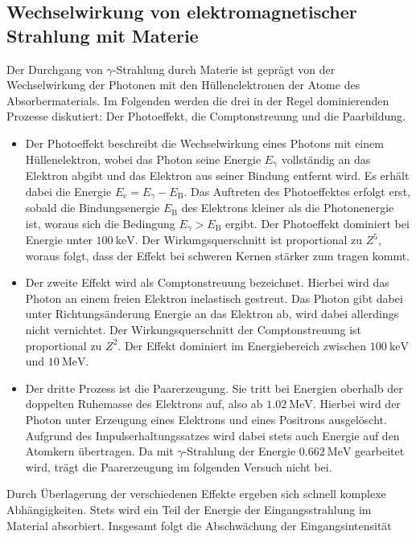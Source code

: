 \subsection{Wechselwirkung von elektromagnetischer Strahlung mit Materie}
Der Durchgang von $\gamma$-Strahlung durch Materie ist geprägt von der
Wechselwirkung der Photonen mit den Hüllenelektronen der Atome des
Absorbermaterials. Im Folgenden werden die drei in der Regel dominierenden
Prozesse diskutiert: Der Photoeffekt, die Comptonstreuung und die Paarbildung.
\begin{itemize}
  \item Der Photoeffekt beschreibt die Wechselwirkung eines Photons mit einem
  Hüllenelektron, wobei das Photon seine Energie $E_{\gamma}$ vollständig an
  das Elektron abgibt und das Elektron aus seiner Bindung  entfernt wird. Es
  erhält dabei die Energie $E_\text{e}=E_{\gamma}-E_\mathup{B}$. Das Auftreten
  des Photoeffektes erfolgt erst, sobald die Bindungsenergie $E_\mathup{B}$ des
  Elektrons kleiner als die Photonenergie ist, woraus sich die Bedingung
  $E_{\gamma}>E_\mathup{B}$ ergibt. Der Photoeffekt dominiert bei Energie unter
  $\SI{100}{\kilo\electronvolt}$. Der Wirkungsquerschnitt ist proportional zu
  $Z^5$, woraus folgt, dass der Effekt bei schweren Kernen stärker zum tragen
  kommt.
  \item Der zweite Effekt wird als Comptonstreuung bezeichnet. Hierbei wird das
  Photon an einem freien Elektron inelastisch gestreut. Das Photon gibt dabei
  unter Richtungsänderung Energie an das Elektron ab, wird dabei allerdings
  nicht vernichtet. Der Wirkungsquerschnitt der Comptonstreuung ist
  proportional zu $Z^2$. Der Effekt dominiert im Energiebereich zwischen
  $\SI{100}{\kilo\electronvolt}$ und $\SI{10}{\mega\electronvolt}$.
  \item Der dritte Prozess ist die Paarerzeugung. Sie tritt bei Energien
  oberhalb der doppelten Ruhemasse des Elektrons auf, also ab
  $\SI{1.02}{\mega\electronvolt}$. Hierbei wird der Photon unter Erzeugung eines
  Elektrons und eines Positrons ausgelöscht. Aufgrund des
  Impulserhaltungssatzes wird dabei stets auch Energie auf den Atomkern
  übertragen. Da mit $\gamma$-Strahlung der Energie
  $\SI{0.662}{\mega\electronvolt}$ gearbeitet wird, trägt die Paarerzeugung im
  folgenden Versuch nicht bei.
\end{itemize}
Durch Überlagerung der verschiedenen Effekte ergeben sich schnell komplexe
Abhängigkeiten. Stets wird ein Teil der Energie der Eingangsstrahlung im
Material absorbiert. Insgesamt folgt die Abschwächung der Eingangsintensität
